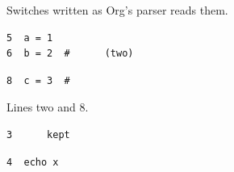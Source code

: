 Switches written as Org's parser reads them.

\begin{verbatim}
5  a = 1
6  b = 2  #      (two)
\end{verbatim}

\begin{verbatim}
8  c = 3  #
\end{verbatim}

Lines two and 8.

\begin{verbatim}
3      kept
\end{verbatim}

\begin{verbatim}
4  echo x
\end{verbatim}
